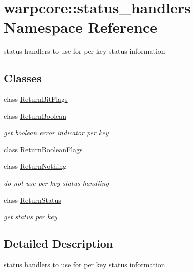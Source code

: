 \hypertarget{namespacewarpcore_1_1status__handlers}{}\section{warpcore\+:\+:status\+\_\+handlers Namespace Reference}
\label{namespacewarpcore_1_1status__handlers}


status handlers to use for per key status information  


\subsection*{Classes}
\begin{DoxyCompactItemize}
\item 
class \hyperlink{classwarpcore_1_1status__handlers_1_1ReturnBitFlags}{Return\+Bit\+Flags}
\item 
class \hyperlink{classwarpcore_1_1status__handlers_1_1ReturnBoolean}{Return\+Boolean}
\begin{DoxyCompactList}\small\item\em get boolean error indicator per key \end{DoxyCompactList}\item 
class \hyperlink{classwarpcore_1_1status__handlers_1_1ReturnBooleanFlags}{Return\+Boolean\+Flags}
\item 
class \hyperlink{classwarpcore_1_1status__handlers_1_1ReturnNothing}{Return\+Nothing}
\begin{DoxyCompactList}\small\item\em do not use per key status handling \end{DoxyCompactList}\item 
class \hyperlink{classwarpcore_1_1status__handlers_1_1ReturnStatus}{Return\+Status}
\begin{DoxyCompactList}\small\item\em get status per key \end{DoxyCompactList}\end{DoxyCompactItemize}


\subsection{Detailed Description}
status handlers to use for per key status information 